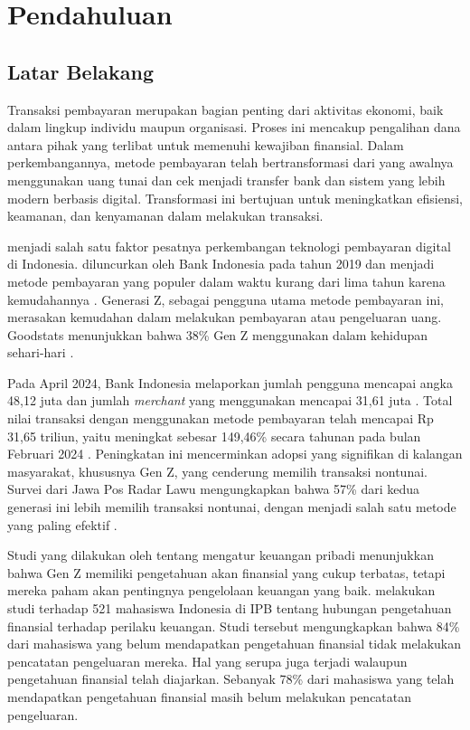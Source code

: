 \chapter{Pendahuluan}
\label{chapter:pendahuluan}

\section{Latar Belakang}
\label{sec:latar-belakang}

Transaksi pembayaran merupakan bagian penting dari aktivitas ekonomi, baik dalam lingkup individu maupun organisasi. Proses ini mencakup pengalihan dana antara pihak yang terlibat untuk memenuhi kewajiban finansial. Dalam perkembangannya, metode pembayaran telah bertransformasi dari yang awalnya menggunakan uang tunai dan cek menjadi transfer bank dan sistem yang lebih modern berbasis digital. Transformasi ini bertujuan untuk meningkatkan efisiensi, keamanan, dan kenyamanan dalam melakukan transaksi.

\qrisfull{} menjadi salah satu faktor pesatnya perkembangan teknologi pembayaran digital di Indonesia. \qris{} diluncurkan oleh Bank Indonesia pada tahun 2019 dan menjadi metode pembayaran yang populer dalam waktu kurang dari lima tahun karena kemudahannya \parencite{qris}. Generasi Z, sebagai pengguna utama metode pembayaran ini, merasakan kemudahan dalam melakukan pembayaran atau pengeluaran uang. Goodstats menunjukkan bahwa 38\% Gen Z menggunakan \qris{} dalam kehidupan sehari-hari \parencite{qris2023goodstats}.


Pada April 2024, Bank Indonesia melaporkan jumlah pengguna \qris{} mencapai angka 48,12 juta dan jumlah \emph{merchant} yang menggunakan mencapai 31,61 juta \parencite{CNNqris2024}. Total nilai transaksi dengan menggunakan metode pembayaran \qris{} telah mencapai Rp 31,65 triliun, yaitu meningkat sebesar 149,46\% secara tahunan pada bulan Februari 2024 \parencite{Tempo2024BIQRIS}. Peningkatan ini mencerminkan adopsi yang signifikan di kalangan masyarakat, khususnya Gen Z, yang cenderung memilih transaksi nontunai. Survei dari Jawa Pos Radar Lawu mengungkapkan bahwa 57\% dari kedua generasi ini lebih memilih transaksi nontunai, dengan \qris{} menjadi salah satu metode yang paling efektif \parencite{jawapos2024qris}.

Studi yang dilakukan oleh \cite{beck2019managing} tentang mengatur keuangan pribadi menunjukkan bahwa Gen Z memiliki pengetahuan akan finansial yang cukup terbatas, tetapi mereka paham akan pentingnya pengelolaan keuangan yang baik. \cite{johan2021effect} melakukan studi terhadap 521 mahasiswa Indonesia di IPB tentang hubungan pengetahuan finansial terhadap perilaku keuangan. Studi tersebut mengungkapkan bahwa 84\% dari mahasiswa yang belum mendapatkan pengetahuan finansial tidak melakukan pencatatan pengeluaran mereka. Hal yang serupa juga terjadi walaupun pengetahuan finansial telah diajarkan. Sebanyak 78\% dari mahasiswa yang telah mendapatkan pengetahuan finansial masih belum melakukan pencatatan pengeluaran. 

